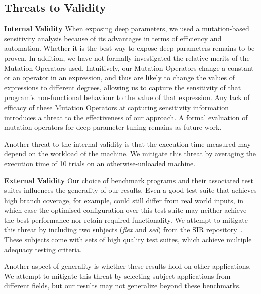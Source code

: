 \subsection{Threats to Validity}

\textbf{Internal Validity}  When exposing deep parameters, we used a mutation-based sensitivity analysis because of its advantages in terms of efficiency and automation. Whether it is the best way to expose deep parameters remains to be proven. In addition, we have not formally investigated the relative merits of the Mutation Operators used. Intuitively, our Mutation Operators change a constant or an operator in an expression, and thus are likely to change the values of expressions to different degrees, allowing us to capture the sensitivity of that program's non-functional behaviour to the value of that expression. Any lack of efficacy of these Mutation Operators at capturing sensitivity information introduces a threat to the effectiveness of our approach. A formal evaluation of mutation operators for deep parameter tuning remains as future work.

Another threat to the internal validity is that the execution time measured
may depend on the workload of the machine. We mitigate this threat by
 averaging the execution time of 10 trials on an otherwise-unloaded machine. 

\textbf{External Validity}  Our choice of benchmark programs and their
associated test suites influences the generality of our results. 
Even a good test suite that achieves high branch coverage, for
example, could still differ from real world
inputs, in which case the optimised configuration over this test suite may
neither achieve the best performance nor retain required functionality.
We attempt to mitigate this threat by including two subjects (\emph{flex} and \emph{sed})
from the SIR repository~\cite{SIR2005}. These subjects come with
sets of high quality test suites, which achieve multiple adequacy 
testing criteria.

Another aspect of generality is whether these results hold on other
applications. We attempt to mitigate this threat by selecting subject
applications from different fields, but our results
may not generalize beyond these benchmarks. 
